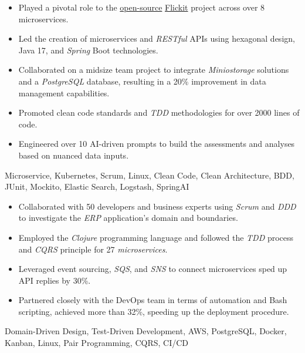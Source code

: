 \vspace*{-10pt}
\begin{experiences}
{
  \begin{itemize}
    \item Played a pivotal role to the \href{https://github.com/flickit-platform/flickit-assessment}{open-source} \href{https://flickit.org/}{Flickit} project across over 8 microservices.
    \item Led the creation of microservices and \emph{RESTful} APIs using hexagonal design, Java 17, and \emph{Spring} Boot technologies.
    \item Collaborated on a midsize team project to integrate \emph{Miniostorage} solutions and a \emph{PostgreSQL} database, resulting in a 20\% improvement in data management capabilities.
    \item Promoted clean code standards and \emph{TDD} methodologies for over 2000 lines of code.
    \item Engineered over 10 AI-driven prompts to build the assessments and analyses based on nuanced data inputs.
  \end{itemize}}{Microservice, Kubernetes, Scrum, Linux, Clean Code, Clean Architecture, BDD, JUnit, Mockito, Elastic Search, Logstash, SpringAI}
 \emptySeparator
 {
\begin{itemize}
   \item Collaborated with 50 developers and business experts using \emph{Scrum} and \emph{DDD} to investigate the \textit{ERP} application's domain and boundaries.
   \item Employed the \emph{Clojure} programming language and followed the \emph{TDD} process and \textit{CQRS} principle for 27 \emph{microservices}.
   \item Leveraged event sourcing, \emph{SQS}, and \emph{SNS} to connect microservices sped up API replies by 30\%.
   \item Partnered closely with the DevOps team in terms of automation and Bash scripting, achieved more than 32\%, speeding up the deployment procedure.
   \end{itemize}}{Domain-Driven Design, Test-Driven Development, AWS, PostgreSQL, Docker, Kanban, Linux, Pair Programming, CQRS, CI/CD}

\end{experiences}
